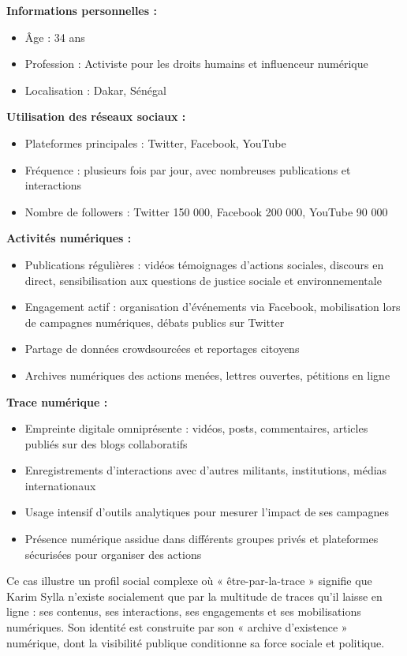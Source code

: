 \documentclass[12pt, a4paper]{article}
\begin{document}
	\textbf{Informations personnelles :}
	\begin{itemize}
		\item Âge : 34 ans
		\item Profession : Activiste pour les droits humains et influenceur numérique
		\item Localisation : Dakar, Sénégal
	\end{itemize}
	
	\textbf{Utilisation des réseaux sociaux :}
	\begin{itemize}
		\item Plateformes principales : Twitter, Facebook, YouTube
		\item Fréquence : plusieurs fois par jour, avec nombreuses publications et interactions
		\item Nombre de followers : Twitter 150 000, Facebook 200 000, YouTube 90 000
	\end{itemize}
	
	\textbf{Activités numériques :}
	\begin{itemize}
		\item Publications régulières : vidéos témoignages d'actions sociales, discours en direct, sensibilisation aux questions de justice sociale et environnementale
		\item Engagement actif : organisation d'événements via Facebook, mobilisation lors de campagnes numériques, débats publics sur Twitter
		\item Partage de données crowdsourcées et reportages citoyens
		\item Archives numériques des actions menées, lettres ouvertes, pétitions en ligne
	\end{itemize}
	
	\textbf{Trace numérique :}
	\begin{itemize}
		\item Empreinte digitale omniprésente : vidéos, posts, commentaires, articles publiés sur des blogs collaboratifs
		\item Enregistrements d'interactions avec d'autres militants, institutions, médias internationaux
		\item Usage intensif d'outils analytiques pour mesurer l'impact de ses campagnes
		\item Présence numérique assidue dans différents groupes privés et plateformes sécurisées pour organiser des actions
	\end{itemize}
	
	Ce cas illustre un profil social complexe où « être-par-la-trace » signifie que Karim Sylla n'existe socialement que par la multitude de traces qu'il laisse en ligne : ses contenus, ses interactions, ses engagements et ses mobilisations numériques. Son identité est construite par son « archive d'existence » numérique, dont la visibilité publique conditionne sa force sociale et politique.
	
\end{document}
